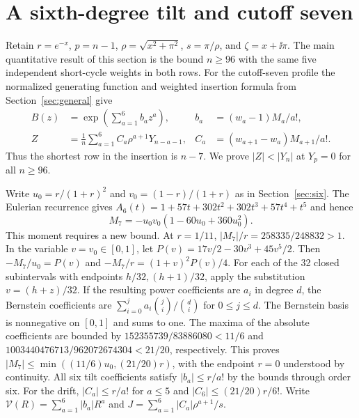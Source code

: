 \section{A sixth-degree tilt and cutoff seven}\label{sec:seven}

Retain \(r=e^{-x}\), \(p=n-1\), \(\rho=\sqrt{x^2+\pi^2}\), \(s=\pi/\rho\), and \(\zeta=x+\ii\pi\).
The main quantitative result of this section is the bound \(n\ge96\) with
the same five independent short-cycle weights in both rows.
For the cutoff-seven profile the normalized generating function and weighted
insertion formula from Section~\ref{sec:general} give
\begin{align*}
 B(z)&=\exp\!\left(\sum_{a=1}^{6}b_a z^a\right),
 & b_a&=(w_a-1)M_a/a!,\\
 Z&=\frac1n\sum_{a=1}^{6} C_a\rho^{a+1}Y_{n-a-1},
 & C_a&=(w_{a+1}-w_a)M_{a+1}/a!.
\end{align*}
Thus the shortest row in the insertion is \(n-7\). We prove
\(|Z|<|Y_n|\) at \(Y_p=0\) for all \(n\ge96\).

Write \(u_0=r/(1+r)^2\) and \(v_0=(1-r)/(1+r)\) as in Section~\ref{sec:six}.
The Eulerian recurrence gives \(A_6(t)=1+57t+302t^2+302t^3+57t^4+t^5\) and hence
\[
 M_7=-u_0v_0(1-60u_0+360u_0^2).
\]
This moment requires a new bound. At \(r=1/11\), \(|M_7|/r=258335/248832>1\).
In the variable \(v=v_0\in[0,1]\), let \(P(v)=17v/2-30v^3+45v^5/2\).
Then \(-M_7/u_0=P(v)\) and \(-M_7/r=(1+v)^2P(v)/4\).
For each of the 32 closed subintervals with endpoints \(h/32,(h+1)/32\),
apply the substitution \(v=(h+z)/32\). If the resulting power coefficients
are \(a_i\) in degree \(d\), the Bernstein coefficients are
\(\sum_{i=0}^{j}a_i\binom ji/\binom di\) for \(0\le j\le d\).
The Bernstein basis is nonnegative on \([0,1]\) and sums to one.
The maxima of the absolute coefficients are bounded by
\(152355739/83886080<11/6\) and \(1003440476713/962072674304<21/20\),
respectively. This proves \(|M_7|\le\min((11/6)u_0,(21/20)r)\), with the
endpoint \(r=0\) understood by continuity. All six tilt coefficients satisfy
\(|b_a|\le r/a!\) by the bounds through order six. For the drift,
\(|C_a|\le r/a!\) for \(a\le5\) and \(|C_6|\le(21/20)r/6!\).
Write \(\mathcal V(R)=\sum_{a=1}^{6}|b_a|R^a\) and
\(J=\sum_{a=1}^{6}|C_a|\rho^{a+1}/s\).

